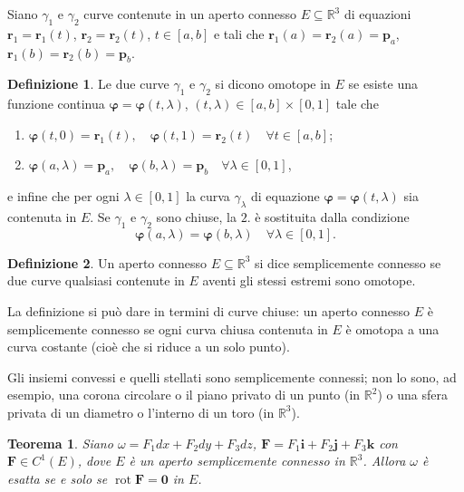 \documentclass[a4paper]{book}
\DeclareMathOperator{\rot}{rot}
\numberwithin{equation}{section}
\renewcommand{\phi}{\varphi}
\theoremstyle{plain}
\newtheorem{teor}{Teorema}[section]
\theoremstyle{definition}
\newtheorem{defn}{Definizione}[section]
\theoremstyle{remark}
\renewcommand{\vec}{\boldsymbol}
\theoremstyle{example}
\begin{document}
Siano $\gamma_1$ e $\gamma_2$ curve contenute in un aperto connesso $E \subseteq \mathbb{R}^3$ di equazioni $\vec{r}_1 = \vec{r}_1(t)$, $\vec{r}_2 = \vec{r}_2(t)$, $t \in [a, b]$ e tali che $\vec{r}_1(a) = \vec{r}_2(a)=\vec{p}_a$, $\vec{r}_1(b) = \vec{r}_2(b) = \vec{p}_b$.

	\begin{defn}
	Le due curve $\gamma_1$ e $\gamma_2$ si dicono omotope in $E$ se esiste una funzione continua $\vec{\phi} = \vec{\phi}(t, \lambda)$, $(t, \lambda) \in [a, b] \times [0, 1]$ tale che
	\begin{enumerate}
	\item $\vec{\phi}(t, 0) = \vec{r}_1(t), \quad \vec{\phi}(t, 1) = \vec{r}_2(t) \quad \forall t \in [a, b]$;
	\item $\vec{\phi}(a, \lambda) = \vec{p}_a, \quad \vec{\phi}(b, \lambda) = \vec{p}_b \quad \forall \lambda \in [0, 1] $,
	\end{enumerate}
e infine che per ogni $\lambda \in [0, 1]$ la curva $\gamma_{\lambda}$ di equazione $\vec{\phi} = \vec{\phi}(t, \lambda)$ sia contenuta in $E$. Se $\gamma_1$ e $\gamma_2$ sono chiuse, la $2.$ è sostituita dalla condizione
	\begin{equation*}
	\vec{\phi}(a, \lambda) = \vec{\phi}(b, \lambda) \quad \forall \lambda \in [0, 1].
	\end{equation*}
	\end{defn}

\begin{defn}
Un aperto connesso $E \subseteq \mathbb{R}^3$ si dice semplicemente connesso se due curve qualsiasi contenute in $E$ aventi gli stessi estremi sono omotope.
\end{defn}

La definizione si può dare in termini di curve chiuse: un aperto connesso $E$ è semplicemente connesso se ogni curva chiusa contenuta in $E$ è omotopa a una curva costante (cioè che si riduce a un solo punto).

Gli insiemi convessi e quelli stellati sono semplicemente connessi; non lo sono, ad esempio, una corona circolare o il piano privato di un punto (in $\mathbb{R}^2$) o una sfera privata di un diametro o l'interno di un toro (in $\mathbb{R}^3$).

\begin{teor}
Siano $\omega = F_1dx + F_2 dy + F_3 dz$, $\vec{F} = F_1\vec{i} + F_2\vec{j} + F_3\vec{k}$ con $\vec{F} \in C^1(E)$, dove $E$ è un aperto semplicemente connesso in $\mathbb{R}^3$. Allora $\omega$ è esatta se e solo se $\rot{\vec{F}} = \vec{0}$ in $E$.
\end{teor}
\end{document}
